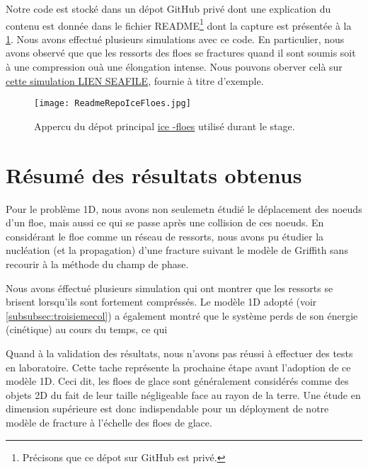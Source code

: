 Notre code est stocké dans un dépot GitHub privé dont une explication du contenu est donnée dans le fichier README\footnote{Précisons que ce dépot sur GitHub est privé.} dont la capture est présentée à la \cref{fig:readme1d}. Nous avons effectué plusieurs simulations avec ce code. En particulier, nous avons observé que que les ressorts des floes se fractures quand il sont soumis soit à une compression ouà une élongation intense. Nous pouvons oberver celà sur \href{www}{cette simulation LIEN SEAFILE}, fournie à titre d'exemple.  
\begin{figure}[!h]
    \centering
    \texttt{[image: ReadmeRepoIceFloes.jpg]}
    \caption{Appercu du dépot principal \href{https://github.com/desmond-rn/ice-floes}{ice
    -floes} utilisé durant le stage.}
    \label{fig:readme1d}
\end{figure}





\section{Résumé des résultats obtenus}


Pour le problème 1D, nous avons non seulemetn étudié le déplacement des noeuds d'un floe, mais aussi ce qui se passe après une collision de ces noeuds. En considérant le floe comme un réseau de ressorts, nous avons pu étudier la nucléation (et la propagation) d'une fracture suivant le modèle de Griffith sans recourir à la méthode du champ de phase.

Nous avons éffectué plusieurs simulation qui ont montrer que les ressorts se brisent lorsqu'ils sont fortement compréssés. Le modèle 1D adopté (voir \cref{subsubsec:troisiemecol}) a également montré que le système perds de son énergie (cinétique) au cours du temps, ce qui 

Quand à la validation des résultats, nous n'avons pas réussi à effectuer des tests en laboratoire. Cette tache représente la prochaine étape avant l'adoption de ce modèle 1D. Ceci dit, les floes de glace sont généralement considérés comme des objets 2D du fait de leur taille négligeable face au rayon de la terre. Une étude en dimension supérieure est donc indispendable pour un déployment de notre modèle de fracture à l'échelle des floes de glace.










